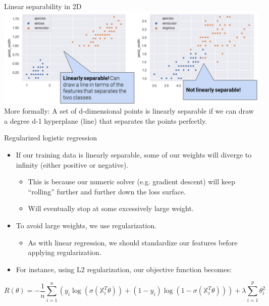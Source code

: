 \documentclass[aspectratio=169]{../latex_main/tntbeamer}  %
\begin{document}
	 
	  \begin{frame}{Linear separability in 2D}
	             \includegraphics[scale=.4]{Bild46}\\
	             More formally: A set of d-dimensional points is linearly separable if we can draw a degree d-1 hyperplane (line) that separates the points perfectly.

	 \end{frame}
	 
	 
	 \begin{frame}{Regularized logistic regression}
	     \begin{itemize}
	         \item If our training data is linearly separable, some of our weights will diverge to infinity (either positive or negative).
	         \begin{itemize}
	             \item This is because our numeric solver (e.g. gradient descent) will keep “rolling” further and further down the loss surface.
	             \item Will eventually stop at some excessively large weight.
	         \end{itemize}
	         \item To avoid large weights, we use regularization.
	         \begin{itemize}
	             \item As with linear regression, we should standardize our features before applying regularization.
	         \end{itemize}
	         \item For instance, using L2 regularization, our objective function becomes:
	     \end{itemize}
	     \begin{equation*}
	         R(\theta) = -\frac{1}{n}\sum\limits_{i=1}^n(y_i\log(\sigma (\mathbb{X}_i^T\theta)) + (1 - y_i)\log(1-\sigma (\mathbb{X}_i^T\theta))) + \lambda\sum\limits_{i=1}^p\theta^2_i
	     \end{equation*}
	 \end{frame}
	 
\end{document}
